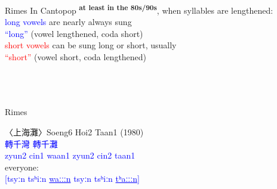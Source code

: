 \documentclass{beamer}
\begin{document}
\begin{frame}[fragile]{Rimes}
In Cantopop \textsuperscript{\textbf{at least in the 80s/90s}}, when syllables are lengthened:\\
\textcolor{blue}{long vowels} are {\scriptsize nearly always} sung\\ \quad \textcolor{blue}{\enquote{long}} (vowel lengthened, coda short)\\
\textcolor{red}{short vowels} can be sung long or short, {\scriptsize usually}\\
\quad \textcolor{red}{\enquote{short}} (vowel short, coda lengthened)\\
\bigskip
{}\\
\quad {}\\
\\

\end{frame}

\begin{frame}[fragile]{Rimes}

〈上海灘〉Soeng6 Hoi2 Taan1 (1980)\\
\medskip
\textcolor{blue}{轉千灣 \quad 轉千灘}\\
\textcolor{blue}{zyun2 cin1 waan1 \quad zyun2 cin2 taan1}\\

\medskip
everyone:\\
\textcolor{blue}{{[}tsyːn tsʰiːn \underline{waːːːn} \quad tsyːn tsʰiːn \underline{tʰaːːːn}{]}}\\

\end{frame}
\end{document}
